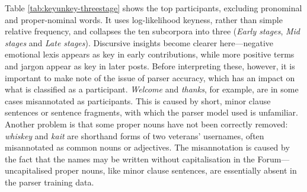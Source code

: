 Table \ref{tab:keyunkey-threestage} shows the top participants, excluding pronominal and proper\hyp{}nominal words. It uses log\hyp{}likelihood keyness, rather than simple relative frequency, and collapses the ten subcorpora into three (\emph{Early stages}, \emph{Mid stages} and \emph{Late stages}). Discursive insights become clearer here---negative emotional lexis appears as key in early contributions, while more positive terms and jargon appear as key in later \glspl{post}. Before interpreting these, however, it is important to make note of the issue of parser accuracy, which has an impact on what is classified as a participant. \emph{Welcome} and \emph{thanks}, for example, are in some cases misannotated as participants. This is caused by short, minor clause sentences or sentence fragments, with which the parser model used is unfamiliar. Another problem is that some proper nouns have not been correctly removed: \emph{whiskey} and \emph{kait} are shorthand forms of two veterans' usernames, often misannotated as common nouns or adjectives. The misannotation is caused by the fact that the names may be written without capitalisation in the Forum---uncapitalised proper nouns, like minor clause sentences, are essentially absent in the parser training data.

%

